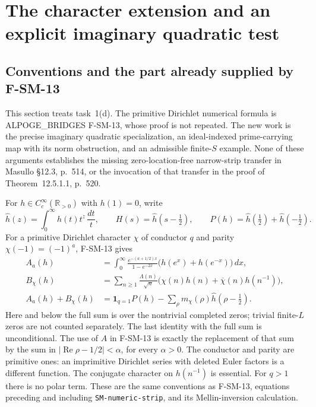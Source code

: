 \section{The character extension and an explicit imaginary quadratic test}
\label{sec:characters}

\subsection{Conventions and the part already supplied by F-SM-13}

This section treats task~1(d).  The primitive Dirichlet numerical
formula is ALPOGE\_BRIDGES F-SM-13, whose proof is not repeated.
The new work is the precise imaginary quadratic specialization,
an ideal-indexed prime-carrying map with its norm obstruction, and
an admissible finite-$S$ example.  None of these arguments establishes
the missing zero-location-free narrow-strip transfer in Masullo
\S12.3, p.~514, or the invocation of that transfer in the proof of
Theorem~12.5.1.1, p.~520.

For $h\in C_c^\infty(\mathbb R_{>0})$ with $h(1)=0$, write
\[
 \widehat h(z)=\int_0^\infty h(t)t^z\,\frac{dt}{t},\qquad
 H(s)=\widehat h(s-\tfrac12),\qquad
 P(h)=\widehat h(\tfrac12)+\widehat h(-\tfrac12).
 \tag{MA-CH.1}
\]
For a primitive Dirichlet character $\chi$ of conductor $q$ and
parity $\chi(-1)=(-1)^a$, F-SM-13 gives
\[
 \begin{split}
 A_a(h)&=\int_0^\infty
   \frac{e^{-(a+1/2)x}}{1-e^{-2x}}
       \bigl(h(e^x)+h(e^{-x})\bigr)\,dx,\\
 B_\chi(h)&=\sum_{n\ge1}\frac{\Lambda(n)}{\sqrt n}
       \bigl(\chi(n)h(n)+\overline\chi(n)h(n^{-1})\bigr),\\
 A_a(h)+B_\chi(h)&=\boldsymbol1_{q=1}P(h)
    -\sum_{\rho}m_\chi(\rho)\widehat h(\rho-\tfrac12).
 \end{split}
 \tag{MA-CH.2}
\]
Here and below the full sum is over the nontrivial completed zeros;
trivial finite-$L$ zeros are not counted separately.  The last
identity with the full sum is unconditional.  The use of $A$ in
F-SM-13 is exactly the replacement of that sum by the sum in
$|\operatorname{Re}\rho-1/2|<\alpha$, for every $\alpha>0$.
The conductor and parity are primitive ones: an imprimitive
Dirichlet series with deleted Euler factors is a different
function.  The conjugate character on $h(n^{-1})$ is essential.
For $q>1$ there is no polar term.  These are the same conventions
as F-SM-13, equations preceding and including
\texttt{SM-numeric-strip}, and its Mellin-inversion calculation.

